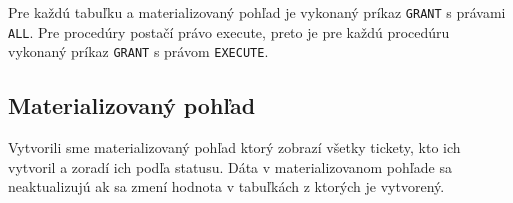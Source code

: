 \documentclass[11pt, a4paper]{article}
\begin{document}
    Pre každú tabuľku a materializovaný pohľad je vykonaný príkaz \texttt{GRANT} s právami \texttt{ALL}.
    Pre procedúry postačí právo execute, preto je pre každú procedúru vykonaný príkaz \texttt{GRANT} s právom \texttt{EXECUTE}.

    \subsection{Materializovaný pohľad}\label{subsec:materializovaný-pohľad}

    Vytvorili sme materializovaný pohľad ktorý zobrazí všetky tickety, kto ich vytvoril a zoradí ich podľa statusu.
    Dáta v materializovanom pohľade sa neaktualizujú ak sa zmení hodnota v tabuľkách z ktorých je vytvorený.
\end{document}
